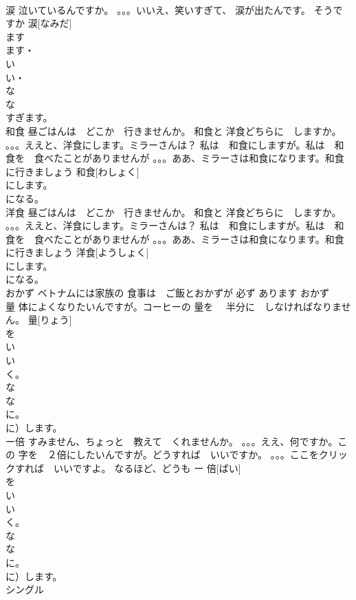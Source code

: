 \documentclass[8pt]{extreport}
\begin{document}
\begin{CJK}{UTF8}{min}
\\	涙	泣いているんですか。 。。。いいえ、笑いすぎて、 涙が出たんです。 そうですか	涙[なみだ]				
\\	ます　
\\	ます・
\\	い
\\	い・
\\	な
\\	な
\\	すぎます。
\\	和食	昼ごはんは　どこか　行きませんか。 和食と 洋食どちらに　しますか。 。。。ええと、洋食にします。ミラーさんは？ 私は　和食にしますが。私は　和食を　食べたことがありませんが 。。。ああ、ミラーさは和食になります。和食に行きましょう	和食[わしょく]				
\\	にします。
\\	になる。
\\	洋食	昼ごはんは　どこか　行きませんか。 和食と 洋食どちらに　しますか。 。。。ええと、洋食にします。ミラーさんは？ 私は　和食にしますが。私は　和食を　食べたことがありませんが 。。。ああ、ミラーさは和食になります。和食に行きましょう	洋食[ようしょく]				
\\	にします。
\\	になる。
\\	おかず	ベトナムには家族の 食事は　ご飯とおかずが 必ず あります	おかず						
\\	量	体によくなりたいんですが。コーヒーの 量を　 半分に　しなければなりません。	量[りょう]				
\\	を
\\	い
\\	い
\\	く。
\\	な
\\	な
\\	に。
\\	に）します。
\\	ー倍	すみません、ちょっと　教えて　くれませんか。 。。。ええ、何ですか。この 字を　２倍にしたいんですが。どうすれば　いいですか。 。。。ここをクリックすれば　いいですよ。 なるほど、どうも	ー 倍[ばい]				
\\	を
\\	い
\\	い
\\	く。
\\	な
\\	な
\\	に。
\\	に）します。
\\	シングル	

\end{CJK}
\end{document}
